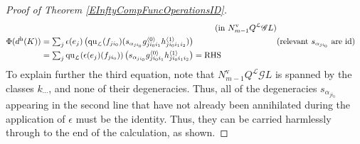 \documentclass[11pt]{amsart} \renewcommand{\baselinestretch}{1.2}
\theoremstyle{plain}
\numberwithin{equation}{section} %
\theoremstyle{plain}
\numberwithin{equation}{chapter} %
\newcommand{\scrG}{\mathscr{G}}
\newcommand{\call}{\mathcal{L}}
\newcommand{\BSW}{{\scrG}}
\newcommand{\quadratic}{\mathrm{qu}}
\newcommand{\Id}{\mathrm{id}}
\newcommand{\uver}{^\mathrm{v}}
\newcommand{\uhor}{^\mathrm{h}}
\begin{document}
\begin{Operations in composite functor spectral sequences}
\begin{proof}[Proof of Theorem \ref{EInftyCompFuncOperationsID}]
\begin{alignat*}{2}
&\qquad&\text{(in $N\uver_{m-1}Q^{\call}\BSW L)$}\\
\Phi(d\uhor(K))&=
\textstyle\sum_j \epsilon (e_j)\left( {\quadratic_\call}(f_{ji_0})(s_{\alpha_{ji_0}}g^{\smash{\langle} 0\smash{\rangle}}_{ji_0i_1}h^{\smash{\langle} 1\smash{\rangle}}_{ji_0i_1i_2})\right)%
&\qquad&\text{(relevant $s_{\alpha_{ji_0}}$ are $\Id$)}\\
&=
\textstyle\sum_j {\quadratic_\call}(\epsilon (e_j)(f_{ji_0}))\left(s_{\alpha_{ji_0}} {g^{\smash{\langle} 0\smash{\rangle}}_{ji_0i_1}h^{\smash{\langle} 1\smash{\rangle}}_{ji_0i_1i_2}}\right) ={}\makebox[0cm][l]{\textup{RHS}}.
\end{alignat*}
To explain further the third equation, note that $N\uver_{m-1}Q^{\call}\BSW L$ is spanned by the classes $k_{\cdots }$, and none of  their degeneracies. Thus, all of the degeneracies $s_{\alpha_{ji_0}}$ appearing in the second line that have not already been annihilated during the application of $\epsilon$ must be the identity. Thus, they can be carried harmlessly through to the end of the calculation, as shown.
\end{proof}













\end{Operations in composite functor spectral sequences}
\end{document}
